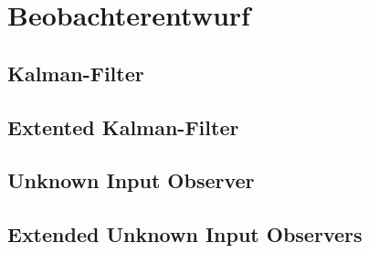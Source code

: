 \chapter{Beobachterentwurf}\label{ch:ch3}


\section{Kalman-Filter}
\section{Extented Kalman-Filter}
\section{Unknown Input Observer}
\section{Extended Unknown Input Observers}





